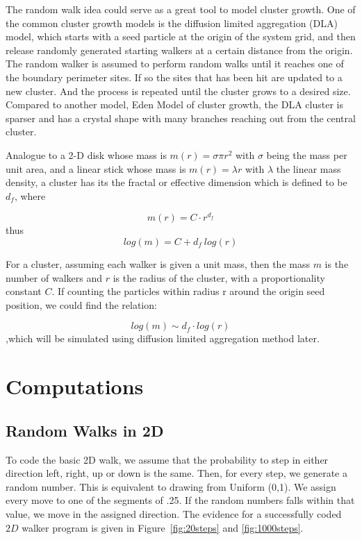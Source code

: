 \documentclass[12pt]{article}
\begin{document}
The random walk idea could serve as a great tool to model cluster growth. One of the common cluster growth models is the diffusion limited aggregation (DLA) model, which starts with a seed particle at the origin of the system grid, and then release randomly generated starting walkers at a certain distance from the origin. The random walker is assumed to perform random walks until it reaches one of the boundary perimeter sites.  If so the sites that has been hit are updated to a new cluster. And the process is repeated until the cluster grows to a desired size. Compared to another model, Eden Model of cluster growth, the DLA cluster is sparser and has a crystal shape with many branches reaching out from the central cluster.

Analogue to a 2-D disk whose mass is $m(r)=\sigma \pi r^2$ with $\sigma$ being the mass per unit area, and a linear stick whose mass is $m(r)=\lambda r$ with $\lambda$ the linear mass density, a cluster has its the fractal or effective dimension which is defined to be $d_f$, where

\begin{equation}
  \label{eq:fractaldimension1}
     m(r)=C\cdot r^{d_f}
\end{equation}
thus
\begin{equation}
  \label{eq:fractaldimension2}
     log(m)=C+d_f\ log(r)
\end{equation}

For a cluster, assuming each walker is given a unit mass, then the mass $m$ is the number of walkers and $r$ is the radius of the cluster, with a proportionality constant $C$. If counting the particles within radius r around the origin seed position, we could find the relation:

\begin{equation}
  \label{eq:fractaldimension3}
     log(m) \sim d_f \cdot log(r)
\end{equation}
,which will be simulated using diffusion limited aggregation method later.


\section{Computations}
\label{sec:computations}

\subsection{Random Walks in 2D}
\label{sec:computationsRandomWalk}
To code the basic 2D walk, we assume that the probability to step in either direction left, right, up or down is the same. Then, for every step, we generate a random number. This is equivalent to drawing from Uniform (0,1). We assign every move to one of the segments of .25. If the random numbers falls within that value, we move in the assigned direction. The evidence for a successfully coded $2D$ walker program is given in Figure~\ref{fig:20steps} and \ref{fig:1000steps}.
\end{document}
